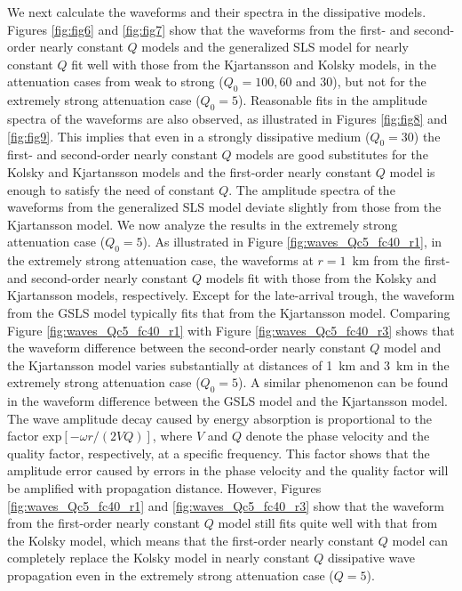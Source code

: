 \documentclass[article]{./macros/elsarticle_qh}
\begin{document}
We next calculate the waveforms and their spectra in the dissipative models. 
Figures \ref{fig:fig6} and \ref{fig:fig7} show that the waveforms from the first- and second-order nearly constant $Q$ models and the generalized SLS model for nearly constant $Q$ fit well with those from the Kjartansson and Kolsky models, in the attenuation cases from weak to strong ($Q_{0}=100, 60$ and $30$), but not for the extremely strong attenuation case ($Q_{0} = 5$). 
Reasonable fits in the amplitude spectra of the waveforms are also observed, as illustrated in Figures \ref{fig:fig8} and \ref{fig:fig9}. This implies that even in a strongly dissipative medium ($Q_{0} = 30$) the first- and second-order nearly constant $Q$ models are good substitutes for the Kolsky and Kjartansson models and the first-order nearly constant $Q$ model is enough to satisfy the need of constant $Q$. The amplitude spectra of the waveforms from the generalized SLS model deviate slightly from those from the Kjartansson model. We now analyze the results in the extremely strong attenuation case ($Q_{0} = 5$). As illustrated in Figure \ref{fig:waves_Qc5_fc40_r1}, in the extremely strong attenuation case, the waveforms at $r=1$~km from the first- and second-order nearly constant $Q$ models fit with those from the Kolsky and Kjartansson models, respectively. Except for the late-arrival trough, the  waveform from the GSLS model typically fits that from the Kjartansson model. Comparing Figure \ref{fig:waves_Qc5_fc40_r1} with Figure \ref{fig:waves_Qc5_fc40_r3} shows that the waveform difference between the second-order nearly constant $Q$ model and the Kjartansson model varies substantially at distances of 1~km and 3~km in the extremely strong attenuation case ($Q_{0} = 5$). A similar phenomenon can be found in the waveform difference between the GSLS model and the Kjartansson model. The wave amplitude decay caused by energy absorption is proportional to the factor $\text{exp}[-\omega r/(2VQ)]$, where $V$ and $Q$ denote the phase velocity and the quality factor, respectively, at a specific frequency. This factor shows that the amplitude error caused by errors in the phase velocity and the quality factor will be amplified with propagation distance. However, Figures \ref{fig:waves_Qc5_fc40_r1} and \ref{fig:waves_Qc5_fc40_r3} show that the waveform from the first-order nearly constant $Q$ model still fits quite well with that from the Kolsky model, which means that the first-order nearly constant $Q$ model can completely replace the Kolsky model in nearly constant $Q$ dissipative wave propagation even in the extremely strong attenuation case ($Q=5$). 
\end{document}
